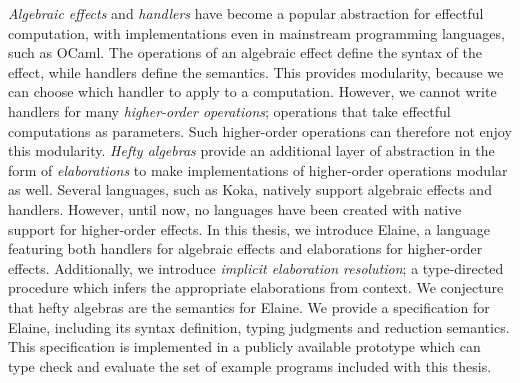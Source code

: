 \noindent
\emph{Algebraic effects} and \emph{handlers} have become a popular abstraction for effectful computation, with implementations even in mainstream programming languages, such as OCaml.
%
%
The operations of an algebraic effect define the syntax of the effect, while handlers define the semantics.
%
This provides modularity, because we can choose which handler to apply to a computation.
%
However, we cannot write handlers for many \emph{higher-order operations}; operations that take effectful computations as parameters. Such higher-order operations can therefore not enjoy this modularity.
%
\emph{Hefty algebras} provide an additional layer of abstraction in the form of \emph{elaborations} to make implementations of higher-order operations modular as well.
%
Several languages, such as Koka, natively support algebraic effects and handlers.
%
However, until now, no languages have been created with native support for higher-order effects.
%
In this thesis, we introduce Elaine, a language featuring both handlers for algebraic effects and elaborations for higher-order effects.
%
Additionally, we introduce \emph{implicit elaboration resolution}; a type-directed procedure which infers the appropriate elaborations from context.
%
We conjecture that hefty algebras are the semantics for Elaine.
%
We provide a specification for Elaine, including its syntax definition, typing judgments and reduction semantics.
%
This specification is implemented in a publicly available prototype which can type check and evaluate the set of example programs included with this thesis.
%
